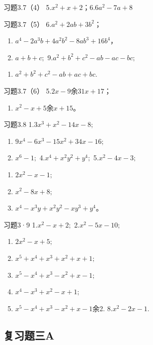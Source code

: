 习题3.7（4） 5.\(x^{2} + x + 2\)；6.\(6a^{2} - 7a + 8\)

习题3.7（5） 6.\(a^2 + 2ab + 3b^2\)；
\begin{enumerate}[start=7]
\item
  \(a^4 - 2a^3b + 4a^2b^2 - 8ab^3 + 16b^4\)，
\item
  \(a + b + c;\) 9.\(a^2 + b^2 + c^2 - ab - ac - bc;\)
\end{enumerate}
\begin{enumerate}[start=10]
\item
  \(a^2 + b^2 + c^2 - ab + ac + bc.\)
\end{enumerate}

习题3.7（6） 5.\(2x - 9\)余\(31x + 17\)；
\begin{enumerate}[start=6]
\item
  \(x^{2} - x + 5\)余\(x + 15\)。
\end{enumerate}

习题3.8 1.\(3x^{3} + x^{2} - 14x - 8;\)
\begin{enumerate}[start=2]
\item
  \(9x^{4} - 6x^{3} - 15x^{2} + 34x - 16;\)
\item
  \(x^{6} - 1;\) 4.\(x^{4} + x^{2}y^{2} + y^{4};\) 5.\(x^{2} - 4x - 3;\)
\end{enumerate}
\begin{enumerate}[start=6]
\item
  \(2x^{2} - x - 1;\)
\item
  \(x^{2} - 8x + 8;\)
\item
  \(x^{4} - x^{3}y + x^{2}y^{2} - xy^{3} + y^{4}\)。
\end{enumerate}

习题3·9 1.\(x^{2} - x + 2;\) 2.\(x^{2} - 5x - 10;\)
\begin{enumerate}[start=3]
\item
  \(2x^{2} - x + 5;\)
\item
  \(x^{5} + x^{4} + x^{3} + x^{2} + x + 1;\)
\item
  \(x^{5} - x^{4} + x^{3} - x^{2} + x - 1;\)
\item
  \(x^{4} - x^{3} + x^{2} - x + 1;\)
\item
  \(x^{5} - x^{4} + x^{3} - x^{2} + x - 1\)余2. 8.\(x^{2} - 2x - 1.\)
\end{enumerate}

\subsection{复习题三A}

